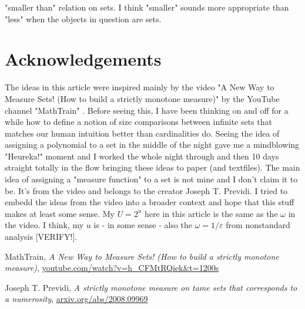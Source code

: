 \documentclass[12pt]{article}
\begin{document}
"smaller than" relation on sets. I think "smaller" sounds more appropriate than "less" when the objects in question are sets.

\section{Acknowledgements}
The ideas in this article were inspired mainly by the video "A New Way to Measure Sets! (How to build a strictly monotone measure)" by the YouTube channel "MathTrain" \cite{MathTrain1}. Before seeing this, I have been thinking on and off for a while how to define a notion of size comparisons between infinite sets that matches our human intuition better than cardinalities do. Seeing the idea of assigning a polynomial to a set in the middle of the night gave me a mindblowing "Heureka!" moment and I worked the whole night through and then 10 days straight totally in the flow bringing these ideas to paper (and textfiles). The main idea of assigning a "measure function" to a set is not mine and I don't claim it to be. It's from the video and belongs to the creator Joseph T. Previdi. I tried to embedd the ideas from the video into a broader context and hope that this stuff makes at least some sense. My $U = 2^u$ here in this article is the same as the $\omega$ in the video. I think, my $u$ is - in some sense - also the $\omega = 1/\varepsilon$ from nonstandard analysis [VERIFY!].


%

\begin{thebibliography}{9}
MathTrain,
\textit{A New Way to Measure Sets! (How to build a strictly monotone measure)},
\href{https://www.youtube.com/watch?v=h_CFMtRQiek&t=1200s}{youtube.com/watch?v=h\_CFMtRQiek\&t=1200s} 

 Joseph T. Previdi,
 \textit{A strictly monotone measure on tame sets that corresponds to a numerosity},
 \href{https://arxiv.org/abs/2008.09969}{arxiv.org/abs/2008.09969}
\end{thebibliography}
 
\end{document}
